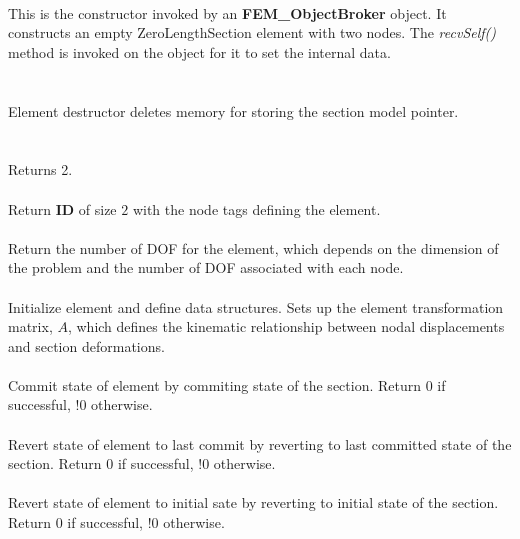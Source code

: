  \\ 
This is the constructor invoked by an {\bf FEM\_ObjectBroker} object. It
constructs an empty ZeroLengthSection element with two nodes.
The {\em recvSelf()} method is
invoked on the object for it to set the internal data. 
\\

 \\
 \\ 
Element destructor deletes memory for storing the section model pointer. 
\\

  \\
 \\
Returns 2.
\\

 \\
Return {\bf ID} of size $2$ with the node tags defining the element.
\\

 \\	
Return the number of DOF for the element, which depends on the dimension of the problem
and the number of DOF associated with each node.
\\

 \\
Initialize element and define data structures.  Sets up the element
transformation matrix, $A$, which defines the kinematic relationship between
nodal displacements and section deformations.
\\

 \\
Commit state of element by commiting state of the section.
Return 0 if successful, !0 otherwise.
\\

 \\        
Revert state of element to last commit by reverting to last committed state of the section.
Return 0 if successful, !0 otherwise.
\\

 \\        
Revert state of element to initial sate by reverting to initial state of the section.
Return 0 if successful, !0 otherwise.
\\

